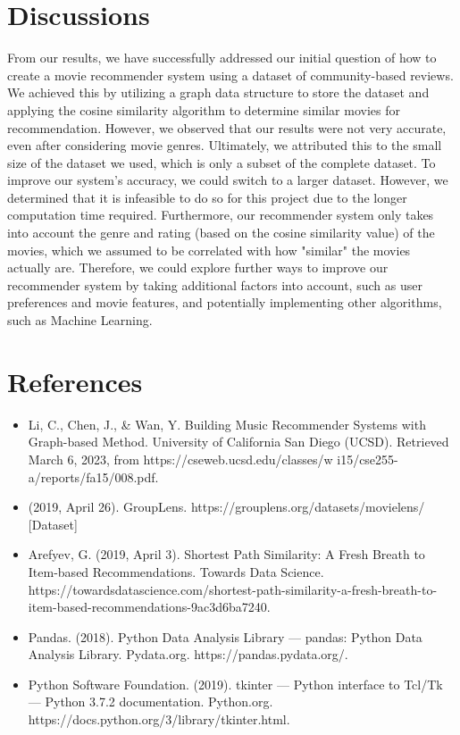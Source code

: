 \documentclass[fontsize=11pt]{article}
\begin{document}
\section*{Discussions}

From our results, we have successfully addressed our initial question of how to create a movie recommender system using a dataset of community-based reviews. We achieved this by utilizing a graph data structure to store the dataset and applying the cosine similarity algorithm to determine similar movies for recommendation. However, we observed that our results were not very accurate, even after considering movie genres. Ultimately, we attributed this to the small size of the dataset we used, which is only a subset of the complete dataset. To improve our system's accuracy, we could switch to a larger dataset. However, we determined that it is infeasible to do so for this project due to the longer computation time required. Furthermore, our recommender system only takes into account the genre and rating (based on the cosine similarity value) of the movies, which we assumed to be correlated with how "similar" the movies actually are. Therefore, we could explore further ways to improve our recommender system by taking additional factors into account, such as user preferences and movie features, and potentially implementing other algorithms, such as Machine Learning.

\section*{References}

\begin{itemize}
    \item Li, C., Chen, J., \& Wan, Y. Building Music Recommender Systems with Graph-based Method. University of California San Diego (UCSD). Retrieved March 6, 2023, from https://cseweb.ucsd.edu/classes/w
    i15/cse255-a/reports/fa15/008.pdf.
    \item (2019, April 26). GroupLens. https://grouplens.org/datasets/movielens/ [Dataset]
    \item Arefyev, G. (2019, April 3). Shortest Path Similarity: A Fresh Breath to Item-based Recommendations. Towards Data Science. https://towardsdatascience.com/shortest-path-similarity-a-fresh-breath-to-item-based-recommendations-9ac3d6ba7240.
    \item Pandas. (2018). Python Data Analysis Library — pandas: Python Data Analysis Library. Pydata.org. https://pandas.pydata.org/.
    \item Python Software Foundation. (2019). tkinter — Python interface to Tcl/Tk — Python 3.7.2 documentation. Python.org. https://docs.python.org/3/library/tkinter.html. 
\end{itemize}

\end{document}
